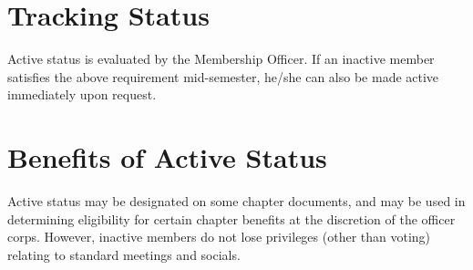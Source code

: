\section{Tracking Status}  Active status is evaluated by the Membership Officer.  If an inactive member satisfies the above requirement mid-semester, he/she can also be made active immediately upon request.  

\section{Benefits of Active Status}  Active status may be designated on some chapter documents, and may be used in determining eligibility for certain chapter benefits at the discretion of the officer corps.  However, inactive members do not lose privileges (other than voting) relating to standard meetings and socials.
